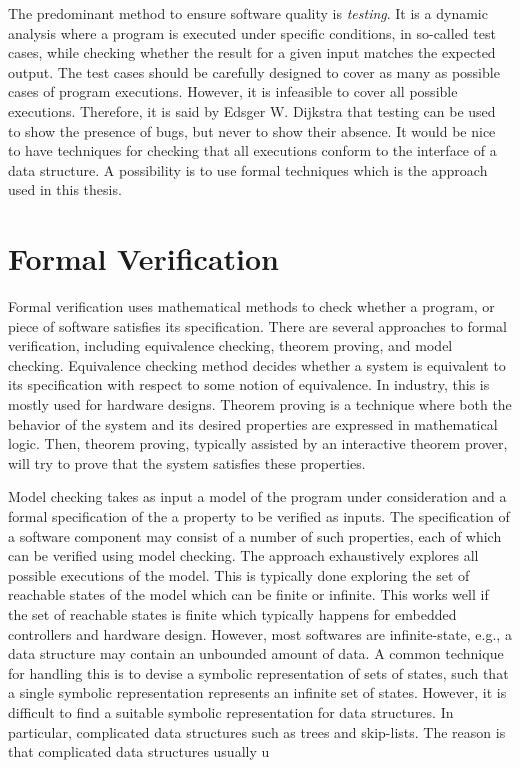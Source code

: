 
The predominant method to ensure software quality is
\emph{testing}. It is a dynamic analysis where a program is executed under specific conditions, in so-called test cases, while checking whether the result for a given input matches the expected output.
%
The test cases should be carefully designed to cover as many as possible cases of program executions.
However, it is infeasible to cover all possible executions. Therefore, it is said by Edsger W. Dijkstra that testing can be used to show the presence of bugs, but never to show their absence. 
It would be nice to have techniques for checking that all executions conform to the interface of a data structure.
A possibility is to use formal techniques which is the approach used in this thesis.

\section{Formal Verification} 
Formal verification uses mathematical methods to check whether a program, or piece of software satisfies its specification. 
There are several approaches to formal verification, including equivalence checking, theorem proving, and model checking. Equivalence checking method decides whether a system is equivalent to its specification with respect to some notion of equivalence. In industry, this is mostly used for hardware designs. Theorem proving is a technique where both the behavior of the system and its desired properties are expressed in mathematical logic. Then, theorem proving, typically assisted by an interactive theorem prover, will try to prove that the system satisfies these properties. 

Model checking takes as input a model of the program under
consideration and a formal specification of the a property to be verified as inputs. The specification of a software component may consist of a number of such properties, each of which can be verified using model checking. The approach exhaustively explores all possible executions of the model. This is typically done exploring the set of reachable states of the model  which can be finite or infinite. 
This works well if the set of reachable states is finite which typically happens for embedded controllers and hardware design. However, most softwares are infinite-state, e.g., a data structure may contain an unbounded amount of data. A common technique for handling this is to devise a symbolic representation of sets of states, such that a single symbolic representation represents an infinite set of states. 
However, it is difficult to find a suitable symbolic representation for data structures. In particular, complicated data structures such as trees and skip-lists. The reason is that complicated data structures usually u 

